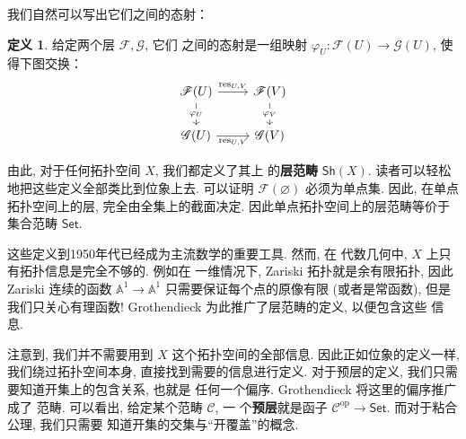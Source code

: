 \documentclass[UTF8]{ctexbook}
\theoremstyle{plain}
\theoremstyle{definition}
\newtheorem{definition}{定义}[chapter]
\theoremstyle{remark}
\begin{document}
我们自然可以写出它们之间的态射：
\begin{definition}
给定两个层 \(\mathscr F, \mathscr G\), 它们
之间的态射是一组映射 \(\varphi_U : \mathscr F(U) \to \mathscr G(U)\),
使得下图交换：
\[\begin{tikzcd}
{\mathscr F(U)} & {\mathscr F(V)} \\
{\mathscr G(U)} & {\mathscr G(V)}
\arrow["{\mathrm{res}_{U,V}}", from=1-1, to=1-2]
\arrow["{\mathrm{res}_{U,V}}"', from=2-1, to=2-2]
\arrow["{\varphi_U}"{description}, from=1-1, to=2-1]
\arrow["{\varphi_V}"{description}, from=1-2, to=2-2]
\end{tikzcd}\]
\end{definition}
由此, 对于任何拓扑空间 \(X\), 我们都定义了其上
的\textbf{层范畴} \(\mathsf{Sh}(X)\).
读者可以轻松地把这些定义全部类比到位象上去.
可以证明 \(\mathscr F(\varnothing)\) 必须为单点集.
因此, 在单点拓扑空间上的层, 完全由全集上的截面决定.
因此单点拓扑空间上的层范畴等价于集合范畴 \(\mathsf{Set}\).

这些定义到1950年代已经成为主流数学的重要工具. 然而, 在
代数几何中, \(X\) 上只有拓扑信息是完全不够的. 例如在
一维情况下, Zariski 拓扑就是余有限拓扑, 因此 Zariski
连续的函数 \(\mathbb A^1 \to \mathbb A^1\)
只需要保证每个点的原像有限 (或者是常函数), 但是我们只关心有理函数!
Grothendieck 为此推广了层范畴的定义, 以便包含这些
信息.

注意到, 我们并不需要用到 \(X\) 这个拓扑空间的全部信息.
因此正如位象的定义一样, 我们绕过拓扑空间本身, 直接找到需要的信息进行定义.
对于预层的定义, 我们只需要知道开集上的包含关系, 也就是
任何一个偏序. Grothendieck 将这里的偏序推广成了
范畴. 可以看出, 给定某个范畴 \(\mathcal C\), 一
个\textbf{预层}就是函子 \(\mathcal C^{\mathrm{op}}
\to \mathsf{Set}\). 而对于粘合公理, 我们只需要
知道开集的交集与“开覆盖”的概念.
\end{document}

